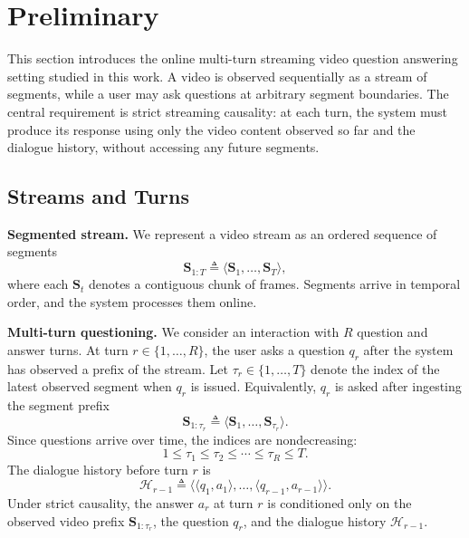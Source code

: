 \documentclass{article}
\begin{document}
\section{Preliminary}
\label{sec:paradigm}

This section introduces the online multi-turn streaming video question answering setting studied in this work. A video is observed sequentially as a stream of segments, while a user may ask questions at arbitrary segment boundaries. The central requirement is strict streaming causality: at each turn, the system must produce its response using only the video content observed so far and the dialogue history, without accessing any future segments.

\subsection{Streams and Turns}
\label{sec:paradigm:stream}

\noindent\textbf{Segmented stream.}
We represent a video stream as an ordered sequence of segments
\begin{equation}
\mathbf{S}_{1:T} \triangleq \langle \mathbf{S}_1,\ldots,\mathbf{S}_T\rangle ,
\end{equation}
where each $\mathbf{S}_t$ denotes a contiguous chunk of frames. Segments arrive in temporal order, and the system processes them online.

\noindent\textbf{Multi-turn questioning.}
We consider an interaction with $R$ question and answer turns. At turn $r \in \{1,\ldots,R\}$, the user asks a question $q_r$ after the system has observed a prefix of the stream. Let $\tau_r \in \{1,\ldots,T\}$ denote the index of the latest observed segment when $q_r$ is issued. Equivalently, $q_r$ is asked after ingesting the segment prefix
\begin{equation}
\mathbf{S}_{1:\tau_r} \triangleq \langle \mathbf{S}_1,\ldots,\mathbf{S}_{\tau_r}\rangle .
\end{equation}
Since questions arrive over time, the indices are nondecreasing:
\begin{equation}
1 \le \tau_1 \le \tau_2 \le \cdots \le \tau_R \le T .
\end{equation}
The dialogue history before turn $r$ is
\begin{equation}
\mathcal{H}_{r-1} \triangleq \langle \langle q_1,a_1\rangle,\ldots,\langle q_{r-1},a_{r-1}\rangle\rangle .
\end{equation}
Under strict causality, the answer $a_r$ at turn $r$ is conditioned only on the observed video prefix $\mathbf{S}_{1:\tau_r}$, the question $q_r$, and the dialogue history $\mathcal{H}_{r-1}$.
\end{document}
